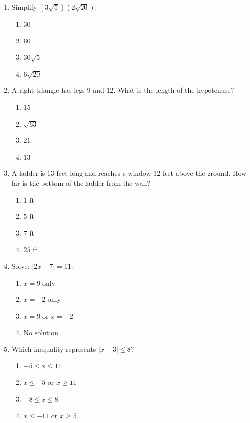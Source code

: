 \documentclass[11pt]{article}
\begin{document}
\begin{enumerate}
\newpage
\begin{partBox}
{\large \textcolor{nppurple2}{\textbf{Part C --- Enhanced Math I Readiness}}}
\end{partBox}
\item Simplify $(3\sqrt{5})(2\sqrt{20})$.
\begin{enumerate}[label=(\Alph*)]
\item $30$ \item $60$ \item $30\sqrt{5}$ \item $6\sqrt{20}$
\end{enumerate}

\item A right triangle has legs $9$ and $12$. What is the length of the hypotenuse?
\begin{enumerate}[label=(\Alph*)]
\item $15$ \item $\sqrt{63}$ \item $21$ \item $13$
\end{enumerate}

\item A ladder is $13$ feet long and reaches a window $12$ feet above the ground. How far is the bottom of the ladder from the wall?
\begin{enumerate}[label=(\Alph*)]
\item $1$ ft \item $5$ ft \item $7$ ft \item $25$ ft
\end{enumerate}

\item Solve: $|2x-7|=11$.
\begin{enumerate}[label=(\Alph*)]
\item $x=9$ only \item $x=-2$ only \item $x=9$ or $x=-2$ \item No solution
\end{enumerate}

\item Which inequality represents $|x-3|\leq 8$?
\begin{enumerate}[label=(\Alph*)]
\item $-5\leq x\leq 11$ \item $x\leq -5$ or $x\geq 11$
\item $-8\leq x\leq 8$ \item $x\leq -11$ or $x\geq 5$
\end{enumerate}


\end{enumerate}
\end{document}
